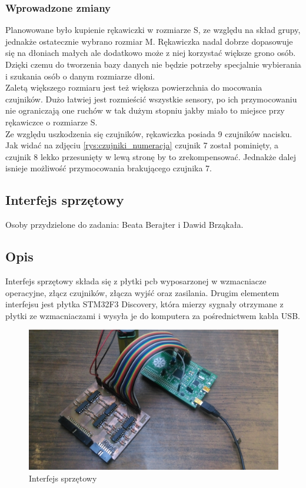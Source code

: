\documentclass{article}
\begin{document}
\subsubsection{Wprowadzone zmiany}
Planowowane było kupienie rękawiczki w rozmiarze S, ze względu na skład grupy, jednakże ostatecznie wybrano rozmiar M. Rękawiczka nadal dobrze dopasowuje się na dłoniach małych ale dodatkowo może z niej korzystać większe grono osób. Dzięki czemu do tworzenia bazy danych nie będzie potrzeby specjalnie wybierania i szukania osób o danym rozmiarze dłoni.\\
Zaletą większego rozmiaru jest też większa powierzchnia do mocowania czujników. Dużo łatwiej jest rozmieścić wszystkie sensory, po ich przymocowaniu nie ograniczają one ruchów w tak dużym stopniu jakby miało to miejsce przy rękawiczce o rozmiarze S.\\
Ze względu uszkodzenia się czujników, rękawiczka posiada 9 czujników nacisku. Jak widać na zdjęciu \ref{rys:czujniki_numeracja} czujnik 7 został pominięty, a czujnik 8 lekko przesunięty w lewą stronę by to zrekompensować. Jednakże dalej isnieje możliwość przymocowania brakującego czujnika 7.

\subsection{Interfejs sprzętowy}

Osoby przydzielone do zadania: Beata Berajter i Dawid Brząkała. \\
\subsection{Opis}
Interfejs sprzętowy składa się z płytki pcb wyposarzonej w wzmacniacze operacyjne, złącz czujników, złącza wyjść oraz zasilania. 
Drugim elementem interfejsu jest płytka STM32F3 Discovery, która mierzy sygnały otrzymane z płytki ze wzmacniaczami i wysyła je do komputera za pośrednictwem kabla USB.
\begin{figure}[H]
	\centering
	\includegraphics[width=12cm]{interfejs+discovery.jpg}
	\caption{Interfejs sprzętowy}
	\label{rys:interfejs_sprzetowy}
\end{figure}
\end{document}

